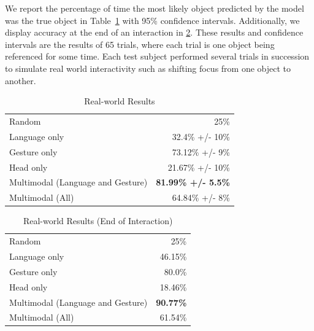 \documentclass[letterpaper, 10 pt, conference]{ieeeconf}
\begin{document}
We report the percentage of time the most likely object predicted by
the model was the true object in Table~\ref{table:real_results} with
95\% confidence intervals. Additionally, we display accuracy at the
end of an interaction in \ref{table:end_real}. These results and
confidence intervals are the results of 65 trials, where each trial is
one object being referenced for some time. Each test subject performed
several trials in succession to simulate real world interactivity such
as shifting focus from one object to another.
\begin{table}
\caption{Real-world Results\label{table:real_results}}
\centering
\begin{tabular}{lr}
\toprule
Random & 25\%\\
Language only &  32.4\% +/- 10\%\\
Gesture only  &  73.12\% +/- 9\%\\
Head only     &  21.67\% +/- 10\%\\
Multimodal (Language and Gesture) & {\bf 81.99\% +/- 5.5\%}\\
Multimodal (All) &  64.84\% +/- 8\%\\
\bottomrule
\end{tabular}
\end{table}
\begin{table}
\caption{Real-world Results (End of Interaction)\label{table:end_real}}
\centering
\begin{tabular}{lr}
\toprule
Random & 25\%\\
Language only &  46.15\%\\
Gesture only  &  80.0\%\\
Head only     & 18.46\%\\
Multimodal (Language and Gesture) & {\bf 90.77\%}\\
Multimodal (All) &  61.54\%\\
\bottomrule
\end{tabular}
\end{table}
\end{document}
